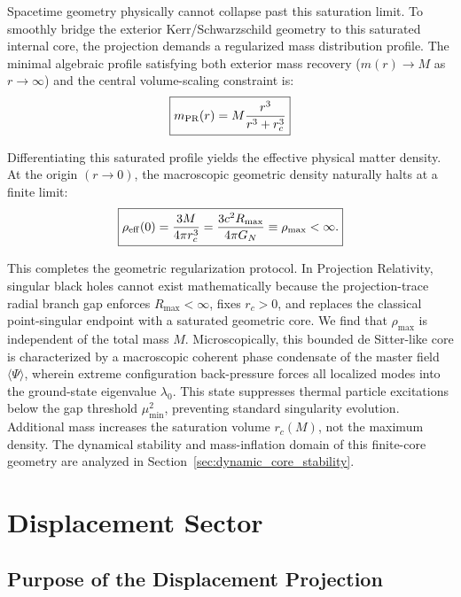 \documentclass[11pt]{article}
\begin{document}
Spacetime geometry physically cannot collapse past this saturation limit. To smoothly bridge the exterior Kerr/Schwarzschild geometry to this saturated internal core, the projection demands a regularized mass distribution profile. The minimal algebraic profile satisfying \cite{Hayward2006} both exterior mass recovery ($m(r) \to M$ as $r \to \infty$) and the central volume-scaling constraint is:
\begin{equation}
\boxed{ m_{\rm PR}(r) = M \frac{r^3}{r^3 + r_c^3} }
\end{equation}

Differentiating this saturated profile yields the effective physical matter density. At the origin \((r\to0)\), the macroscopic geometric density naturally halts at a finite limit:
\begin{equation}
\boxed{
\rho_{\rm eff}(0)
=
\frac{3M}{4\pi r_c^3}
=
\frac{3c^2R_{\max}}{4\pi G_N}
\equiv
\rho_{\max}
<
\infty .
}
\label{eq:rho_max_core}
\end{equation}

This completes the geometric regularization protocol. In Projection Relativity, singular black holes cannot exist mathematically because the projection-trace radial branch gap enforces \(R_{\max}<\infty\), fixes \(r_c>0\), and replaces the classical point-singular endpoint with a saturated geometric core. We find that \(\rho_{\max}\) is independent of the total mass \(M\). \noindent Microscopically, this bounded de Sitter-like core is characterized by a macroscopic coherent phase condensate of the master field $\langle \Psi \rangle$, wherein extreme configuration back-pressure forces all localized modes into the ground-state eigenvalue $\lambda_0$. This state suppresses thermal particle excitations below the gap threshold $\mu_{\min}^2$, preventing standard singularity evolution. Additional mass increases the saturation volume \(r_c(M)\), not the maximum density. The dynamical stability and mass-inflation domain of this finite-core geometry
are analyzed in Section~\ref{sec:dynamic_core_stability}.

\section{Displacement Sector}
\label{sec:displacement_sector}
\label{sec:displacement_higgs_sector}

\subsection{Purpose of the Displacement Projection}
\label{sec:purpose_displacement_projection}
\end{document}
